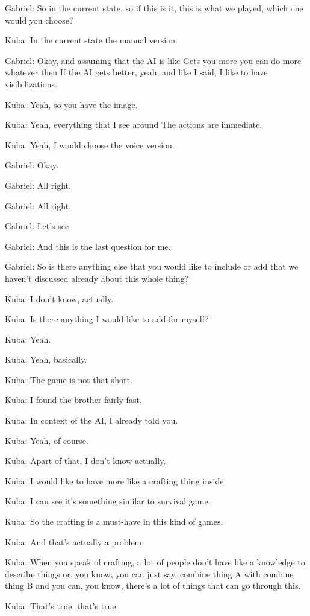 Gabriel: So in the current state, so if this is it, this is what we played, which one would you choose?

Kuba: In the current state the manual version.

Gabriel: Okay, and assuming that the AI is like Gets you more you can do more whatever then If the AI gets better, yeah, and like I said, I like to have visibilizations.

Kuba: Yeah, so you have the image.

Kuba: Yeah, everything that I see around The actions are immediate.

Kuba: Yeah, I would choose the voice version.

Gabriel: Okay.

Gabriel: All right.

Gabriel: All right.

Gabriel: Let's see

Gabriel: And this is the last question for me.

Gabriel: So is there anything else that you would like to include or add that we haven't discussed already about this whole thing?

Kuba: I don't know, actually.

Kuba: Is there anything I would like to add for myself?

Kuba: Yeah.

Kuba: Yeah, basically.

Kuba: The game is not that short.

Kuba: I found the brother fairly fast.

Kuba: In context of the AI, I already told you.

Kuba: Yeah, of course.

Kuba: Apart of that, I don't know actually.

Kuba: I would like to have more like a crafting thing inside.

Kuba: I can see it's something similar to survival game.

Kuba: So the crafting is a must-have in this kind of games.

Kuba: And that's actually a problem.

Kuba: When you speak of crafting, a lot of people don't have like a knowledge to describe things or, you know, you can just say, combine thing A with combine thing B and you can, you know, there's a lot of things that can go through this.

Kuba: That's true, that's true.

